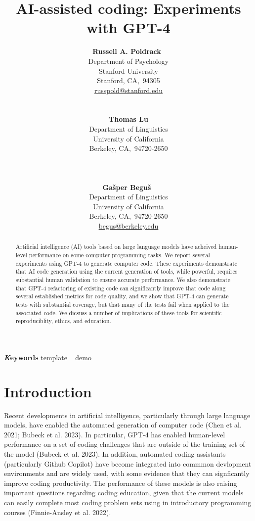 \documentclass[
]{article}
\title{AI-assisted coding: Experiments with GPT-4}
\author{
\textbf{Russell A. Poldrack}~\orcidlink{0000-0001-6755-0259}\\Department
of Psychology\\Stanford University\\Stanford,
CA,\ 94305\\\href{mailto:russpold@stanford.edu}{russpold@stanford.edu}\\\\\\
\textbf{Thomas Lu}\\Department of Linguistics\\University of
California\\Berkeley, CA,\ 94720-2650\\\\\\\\
\textbf{Ga\v{s}per
Begu\v{s}}~\orcidlink{0000-0002-6459-0551}\\Department of
Linguistics\\University of California\\Berkeley,
CA,\ 94720-2650\\\href{mailto:begus@berkeley.edu}{begus@berkeley.edu}}
\date{}
\begin{document}
\maketitle
\begin{abstract}
Artificial intelligence (AI) tools based on large language models have
acheived human-level performance on some computer programming tasks. We
report several experiments using GPT-4 to generate computer code. These
experiments demonstrate that AI code generation using the current
generation of tools, while powerful, requires substantial human
validation to ensure accurate performance. We also demonstrate that
GPT-4 refactoring of existing code can significantly improve that code
along several established metrics for code quality, and we show that
GPT-4 can generate tests with substantial coverage, but that many of the
tests fail when applied to the associated code. We dicsuss a number of
implications of these tools for scientific reproduciblity, ethics, and
education.
\end{abstract}
{\bfseries \emph Keywords}
\def\sep{\textbullet\ }
template \sep 
demo

\ifdefined\Shaded\renewenvironment{Shaded}{\begin{tcolorbox}[sharp corners, interior hidden, borderline west={3pt}{0pt}{shadecolor}, breakable, boxrule=0pt, frame hidden, enhanced]}{\end{tcolorbox}}\fi

\hypertarget{sec-intro}{%
\section{Introduction}\label{sec-intro}}

Recent developments in artificial intelligence, particularly through
large language models, have enabled the automated generation of computer
code (Chen et al. 2021; Bubeck et al. 2023). In particular, GPT-4 has
enabled human-level performance on a set of coding challenges that are
outside of the training set of the model (Bubeck et al. 2023). In
addition, automated coding assistants (particularly Github Copilot) have
become integrated into commmon devlopment environments and are widely
used, with some evidence that they can signficantly improve coding
productivity. The performance of these models is also raising important
questions regarding coding education, given that the current models can
easily complete most coding problem sets using in introductory
programming courses (Finnie-Ansley et al. 2022).
\end{document}
